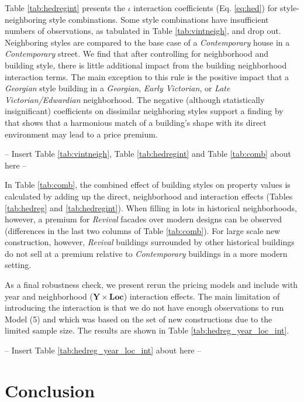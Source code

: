 \documentclass[]{article}
\begin{document}
Table \ref{tab:hedregint} presents the \(\iota\) interaction coefficients (Eq. \ref{eq:hed}) for style-neighboring style combinations. Some style combinations have insufficient numbers of observations, as tabulated in Table \ref{tab:vintneigh}, and drop out.
Neighboring styles are compared to the base case of a \emph{Contemporary} house in a \emph{Contemporary} street. We find that after controlling for neighborhood and building style, there is little additional impact from the building neighborhood interaction terms. The main exception to this rule is the positive impact that a \emph{Georgian} style building in a \emph{Georgian}, \emph{Early Victorian}, or \emph{Late Victorian/Edwardian} neighborhood. The negative (although statistically insignificant) coefficients on dissimilar neighboring styles support a finding by \textcite{Lindenthal2017} that shows that a harmonious match of a building's shape with its direct environment may lead to a price premium. 

\begin{center}
  -- Insert  Table \ref{tab:vintneigh}, Table \ref{tab:hedregint} and Table \ref{tab:comb} about here --
\end{center}

In Table \ref{tab:comb}, the combined effect of building styles on
property values is calculated by adding up the direct, neighborhood and
interaction effects (Tables \ref{tab:hedreg} and \ref{tab:hedregint}).
When filling in lots in historical neighborhoods, however, a premium for
\emph{Revival} facades over modern designs can be observed (differences
in the last two columns of Table \ref{tab:comb}). For large scale new
construction, however, \emph{Revival} buildings surrounded by other
historical buildings do not sell at a premium relative to \emph{Contemporary}
buildings in a more modern setting.

As a final robustness check, we present rerun the pricing models and include with year and neighborhood ($ \mathbf{Y}\times\mathbf{Loc}$) interaction effects. The main limitation of introducing the interaction is that we do not have enough observations to run Model (5) and  which was based on the set of new constructions due to the limited sample size. The results are shown in Table \ref{tab:hedreg_year_loc_int}.  

\begin{center}
    -- Insert Table \ref{tab:hedreg_year_loc_int} about here --
\end{center}

\hypertarget{conclusion}{%
\section{Conclusion}\label{conclusion}}
\end{document}
